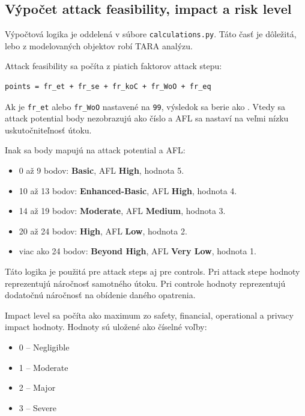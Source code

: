 \documentclass[11pt]{article}
\begin{document}
\subsection{Výpočet attack feasibility, impact a risk level}

Výpočtová logika je oddelená v súbore \texttt{calculations.py}. Táto časť je dôležitá, lebo z modelovaných objektov robí TARA analýzu.

Attack feasibility sa počíta z piatich faktorov attack stepu:

\begin{verbatim}
points = fr_et + fr_se + fr_koC + fr_WoO + fr_eq
\end{verbatim}

Ak je \texttt{fr\_et} alebo \texttt{fr\_WoO} nastavené na \texttt{99}, výsledok sa berie ako . Vtedy sa attack potential body nezobrazujú ako číslo a AFL sa nastaví na veľmi nízku uskutočniteľnosť útoku.

Inak sa body mapujú na attack potential a AFL:

\begin{itemize}
    \item 0 až 9 bodov: \textbf{Basic}, AFL \textbf{High}, hodnota 5.
    \item 10 až 13 bodov: \textbf{Enhanced-Basic}, AFL \textbf{High}, hodnota 4.
    \item 14 až 19 bodov: \textbf{Moderate}, AFL \textbf{Medium}, hodnota 3.
    \item 20 až 24 bodov: \textbf{High}, AFL \textbf{Low}, hodnota 2.
    \item viac ako 24 bodov: \textbf{Beyond High}, AFL \textbf{Very Low}, hodnota 1.
\end{itemize}

Táto logika je použitá pre attack steps aj pre controls. Pri attack stepe hodnoty reprezentujú náročnosť samotného útoku. Pri controle hodnoty reprezentujú dodatočnú náročnosť na obídenie daného opatrenia.

Impact level sa počíta ako maximum zo safety, financial, operational a privacy impact hodnoty. Hodnoty sú uložené ako číselné voľby:

\begin{itemize}
    \item 0 -- Negligible
    \item 1 -- Moderate
    \item 2 -- Major
    \item 3 -- Severe
\end{itemize}
\end{document}
